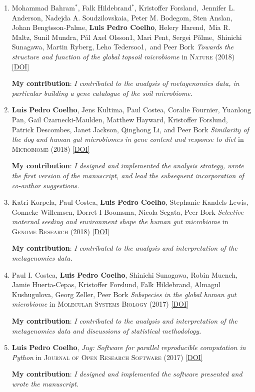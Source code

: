 \documentclass{article}
\newcommand\showdoi[1]{%
    \href{http://dx.doi.org/#1}{[DOI]}%
}
\newcommand\pubname[1]{\textsc{#1}}
\newcommand\contribution[1]{\relax\hfill\break\textbf{My contribution}: \textit{#1}}
\newcommand\costar{${}^{*}$}
\begin{document}
\begin{enumerate}[resume]
\item Mohammad Bahram\costar, Falk Hildebrand\costar, Kristoffer
Forsland, Jennifer L.  Anderson, Nadejda A. Soudzilovskaia, Peter M.  Bodegom,
Sten Anslan, Johan Bengtsson-Palme, \textbf{Luis Pedro Coelho}, Helery
Harend, Mia R. Maltz, Sunil Mundra, Pål Axel Olsson1, Mari Pent, Sergei
Põlme, Shinichi Sunagawa, Martin Ryberg, Leho Tedersoo1, and Peer Bork
\emph{Towards the structure and function
of the global topsoil microbiome} in \pubname{Nature} (2018)
\showdoi{10.1038/s41586-018-0386-6}
\contribution{I contributed to the analysis of metagenomics data, in particular
building a gene catalogue of the soil microbiome.}


\item \textbf{Luis Pedro Coelho}, Jens Kultima, Paul Costea, Coralie Fournier,
Yuanlong Pan, Gail Czarnecki-Maulden, Matthew Hayward, Kristoffer Forslund,
Patrick Descombes, Janet Jackson, Qinghong Li, and Peer Bork \emph{Similarity
of the dog and human gut microbiomes in gene content and response to diet} in
\pubname{Microbiome} (2018) \showdoi{10.1186/s40168-018-0450-3}
\contribution{I designed and implemented the analysis strategy, wrote the first
version of the manuscript, and lead the subsequent incorporation of co-author
suggestions.}

\item Katri Korpela, Paul Costea, \textbf{Luis Pedro Coelho}, Stephanie
Kandels-Lewis, Gonneke Willemsen, Dorret I Boomsma, Nicola Segata, Peer Bork
\emph{Selective maternal seeding and environment shape the human gut
microbiome} in \pubname{Genome Research} (2018) \showdoi{10.1101/gr.233940.117}
\contribution{I contributed to the analysis and interpretation of the
metagenomics data.}

\item Paul I. Costea, \textbf{Luis Pedro Coelho}, Shinichi Sunagawa, Robin
Muench, Jamie Huerta-Cepas, Kristoffer Forslund, Falk Hildebrand, Almagul
Kushugulova, Georg Zeller, Peer Bork \emph{Subspecies in the global human gut
microbiome} in \pubname{Molecular Systems Biology} (2017)
\showdoi{10.15252/msb.20177589}
\contribution{I contributed to the analysis and interpretation of the
metagenomics data and discussions of statistical methodology.}

\item \textbf{Luis Pedro Coelho}, \emph{Jug: Software for parallel reproducible
computation in Python} in \pubname{Journal of Open Research
Software} (2017) \showdoi{10.5334/jors.161}
\contribution{I designed and implemented the software presented and wrote the
manuscript.}


\end{enumerate}
\end{document}
